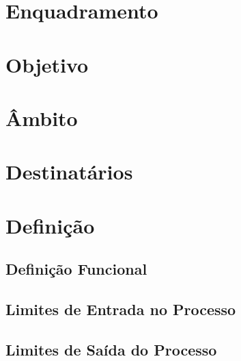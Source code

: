 %

\tableofcontents
\newpage


\section{Enquadramento}\label{sec:enquadramento}

\section{Objetivo}\label{sec:objetivo}

\section{Âmbito}\label{sec:ambito}

\section{Destinatários}\label{sec:destinatarios}

\section{Definição}\label{sec:definicao}

    \subsection{Definição Funcional}\label{subsec:definicao-funcional}
    
    \subsection{Limites de Entrada no Processo}\label{subsec:limites-de-entrada-no-processo}

    \subsection{Limites de Saída do Processo}\label{subsec:limites-de-saida-do-processo}

